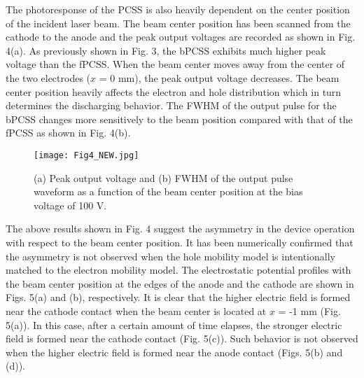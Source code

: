 \documentclass[final,5p,times,twocolumn]{elsarticle}
\begin{document}
      

 
   The photoresponse of the PCSS is also heavily dependent on the center position of the incident laser beam.  
   The beam center position has been scanned from the cathode to the anode and the peak output voltages are recorded as shown in Fig. 4(a).   
   As previously shown in Fig. 3, the bPCSS exhibits much higher peak voltage than the fPCSS.
   When the beam center moves away from the center of the two electrodes ($x$ = 0 mm), the peak output voltage decreases.
   The beam center position heavily affects the electron and hole distribution which in turn determines the discharging behavior. 
   The FWHM of the output pulse for the bPCSS changes more sensitively to the beam position compared with that of the fPCSS as shown in Fig. 4(b).

\begin{figure}[!t]
\centering
\texttt{[image: Fig4\_NEW.jpg]}
\caption{
(a)
Peak output voltage and 
(b)
FWHM of the output pulse waveform as a function of the beam center position at the bias voltage of 100 V. 
}
\label{fig_position}
\end{figure}     

   The above results shown in Fig. 4 suggest the asymmetry in the device operation with respect to the beam center position.
   It has been numerically confirmed that the asymmetry is not observed when the hole mobility model is intentionally matched to the electron mobility model.   
   The electrostatic potential profiles with the beam center position at the edges of the anode and the cathode are shown in Figs. 5(a) and (b), respectively.
   It is clear that the higher electric field is formed near the cathode contact when the beam center is located at $x$ = -1 mm (Fig. 5(a)).
   In this case, after a certain amount of time elapses, the stronger electric field is formed near the cathode contact (Fig. 5(c)).
   Such behavior is not observed when the higher electric field is formed near the anode contact (Figs. 5(b) and (d)).  
\end{document}

